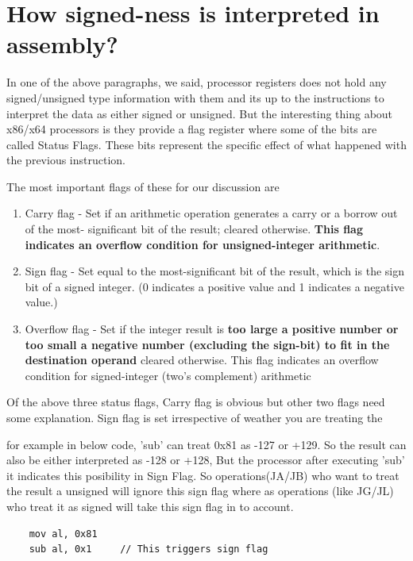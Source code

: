 \documentclass{article}
\begin{document}
\section{How signed-ness is interpreted in assembly?}
In one of the above paragraphs, we said, processor registers does not hold any
signed/unsigned type information with them and its up to the instructions to
interpret the data as either signed or unsigned. But the interesting thing
about x86/x64 processors is they provide a flag register where some of the
bits are called Status Flags. These bits represent the specific effect of
what happened with the previous instruction.

The most important flags of these for our discussion are

\begin{enumerate}[noitemsep]
    \item Carry flag - Set if an arithmetic operation generates a carry or a borrow out of the most-
significant bit of the result; cleared otherwise. \textbf{This flag indicates
an overflow condition for unsigned-integer arithmetic}.
    \item Sign flag - Set equal to the most-significant bit of the result, which is the sign bit of a signed
integer. (0 indicates a positive value and 1 indicates a negative value.)
    \item Overflow flag - Set if the integer result is \textbf{too large a
    positive number or too small a negative number (excluding the sign-bit) to
    fit in the destination operand} cleared otherwise. This flag
indicates an overflow condition for signed-integer (two's complement) arithmetic
\end{enumerate}

Of the above three status flags, Carry flag is obvious but other two flags need
some explanation. Sign flag is set irrespective of weather you are treating the

for example in below code, 'sub' can treat 0x81 as -127 or +129. So the result
can also be either interpreted as -128 or +128, But the processor after
executing 'sub' it indicates this posibility in Sign Flag. So operations(JA/JB)
who want to treat the result a unsigned will ignore this sign flag where as
operations (like JG/JL) who treat it as signed will take this sign flag in to
account.
\begin{verbatim}
    mov al, 0x81
    sub al, 0x1     // This triggers sign flag
\end{verbatim}
\end{document}
